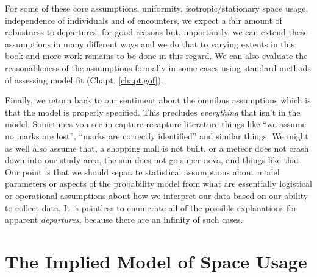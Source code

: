 For some of these core assumptions, uniformity, isotropic/stationary
space usage, independence of individuals and of encounters, we expect
a fair amount of robustness to departures, for good reasons but,
importantly, we can extend these assumptions in many different ways
and we do that to varying extents in this book and more work remains
to be done in this regard. We can also evaluate the reasonableness of the assumptions
formally in some cases using standard methods of assessing model fit
(Chapt. \ref{chapt.gof}).



Finally, we return back to our sentiment about the omnibus assumptions
which is that the model is properly specified. This precludes {\it
  everything} that isn't in the model. Sometimes you see in
capture-recapture literature things like ``we assume no marks are
lost'', ``marks are correctly identified'' and similar things. We
might as well also assume that, a shopping mall is not built, or a
meteor does not crash down into our study area, the sun does not go
super-nova, and things like that. Our point is that we should separate
statistical assumptions about model parameters or aspects of the
probability model from what are essentially logistical or operational
assumptions about how we interpret our data based on our ability to
collect data. It is pointless to enumerate all of the possible
explanations for apparent {\it departures}, because there are an
infinity of such cases.



\section{The Implied Model of Space Usage}
\label{scr0.sec.implied}


